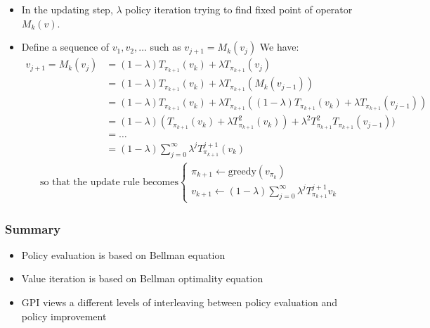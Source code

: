\documentclass[10pt]{beamer}
\theoremstyle{remark}
\begin{document}
\begin{frame}
    \begin{itemize}
        \item In the updating step, $\lambda$ policy iteration trying to find fixed point of operator $M_k(v)$. 
        \item Define a sequence of $v_1, v_2, \ldots $ such as $v_{j+1} = M_k(v_j)$
            We have:
            \begin{align*}
                v_{j+1} = M_k(v_j) 
                &= (1- \lambda) T_{\pi_{k+1}}(v_k) + \lambda T_{\pi_{k+1}}(v_j) \\
                &= (1- \lambda) T_{\pi_{k+1}}(v_k) + \lambda T_{\pi_{k+1}}(M_k(v_{j-1})) \\
                &= (1- \lambda) T_{\pi_{k+1}}(v_k) + \lambda T_{\pi_{k+1}}\left( (1-\lambda) T_{\pi_{k+1}}(v_k) + \lambda T_{\pi_{k+1}} (v_{j-1}) \right) \\
                &= (1- \lambda) (T_{\pi_{k+1}}(v_k) + \lambda T_{\pi_{k+1}}^2 (v_k)) + \lambda^2 T_{\pi_{k+1}}^2 T_{\pi_{k+1}} (v_{j-1}) ) \\
                &= \ldots  \\
                &= (1- \lambda) \sum^{\infty}_{j=0} \lambda^{j} T_{\pi_{k+1}}^{j+1} (v_k)
            \end{align*}
    \begin{align*}
        \text{so that the update rule becomes}
    \begin{cases}
        \pi_{k+1} \leftarrow \text{greedy}(v_{\pi_k}) \\
        v_{k+1} \leftarrow (1- \lambda) \sum^{\infty}_{j=0} \lambda^{j} T_{\pi_{k+1}}^{j+1} v_k  
    \end{cases}
    \end{align*} 
    \end{itemize}
\end{frame}

\begin{frame}
    \frametitle{Summary}
    \begin{itemize}
        \item Policy evaluation is based on Bellman equation
        \item Value iteration is based on Bellman optimality equation
        \item GPI views a different levels of interleaving between policy evaluation and policy improvement
    \end{itemize}
\end{frame}
\end{document}
